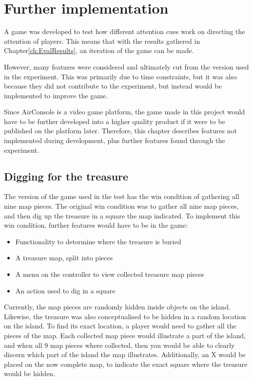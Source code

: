 \chapter{Further implementation}\label{ch:further_implementation}
A game was developed to test how different attention cues work on directing the attention of players. This means that with the results gathered in Chapter\ref{ch:EvalResults}, an iteration of the game can be made.

However, many features were considered and ultimately cut from the version used in the experiment. This was primarily due to time constraints, but it was also because they did not contribute to the experiment, but instead would be implemented to improve the game.

Since AirConsole is a video game platform, the game made in this project would have to be further developed into a higher quality product if it were to be published on the platform later. Therefore, this chapter describes features not implemented during development, plus further features found through the experiment.

\section{Digging for the treasure}\label{sec:digging}
The version of the game used in the test has the win condition of gathering all nine map pieces. 
The original win condition was to gather all nine map pieces, and then dig up the treasure in a square the map indicated. To implement this win condition, further features would have to be in the game:
\begin{itemize}
\item Functionality to determine where the treasure is buried
\item A treasure map, split into pieces
\item A menu on the controller to view collected treasure map pieces
\item An action used to dig in a square
\end{itemize}

Currently, the map pieces are randomly hidden inside objects on the island. Likewise, the treasure was also conceptualised to be hidden in a random location on the island. To find its exact location, a player would need to gather all the pieces of the map. Each collected map piece would illustrate a part of the island, and when all 9 map pieces where collected, then you would be able to clearly discern which part of the island the map illustrates. Additionally, an X would be placed on the now complete map, to indicate the exact square where the treasure would be hidden.


